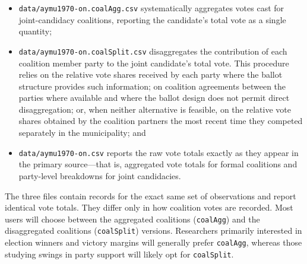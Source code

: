 \documentclass[letter,12pt]{article}
\begin{document}
\begin{itemize}
\item \verb|data/aymu1970-on.coalAgg.csv| systematically aggregates votes cast for joint-candidacy coalitions, reporting the candidate's total vote as a single quantity;
\item \verb|data/aymu1970-on.coalSplit.csv| disaggregates the contribution of each coalition member party to the joint candidate's total vote. This procedure relies on the relative vote shares received by each party where the ballot structure provides such information; on coalition agreements between the parties where available and where the ballot design does not permit direct disaggregation; or, when neither alternative is feasible, on the relative vote shares obtained by the coalition partners the most recent time they competed separately in the municipality; and
\item \verb|data/aymu1970-on.csv| reports the raw vote totals exactly as they appear in the primary source---that is, aggregated vote totals for formal coalitions and party-level breakdowns for joint candidacies.
\end{itemize}

\noindent The three files contain records for the exact same set of observations and report identical vote totals. They differ only in how coalition votes are recorded. Most users will choose between the aggregated coalitions (\verb|coalAgg|) and the disaggregated coalitions (\verb|coalSplit|) versions. Researchers primarily interested in election winners and victory margins will generally prefer \verb|coalAgg|, whereas those studying swings in party support will likely opt for \verb|coalSplit|.
\end{document}

